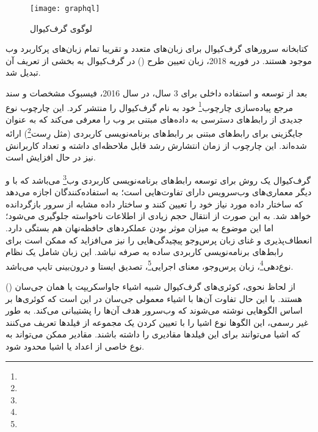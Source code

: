 \begin{figure}[H]
	\centering
	\texttt{[image: graphql]}
	\caption{لوگوی گرف‌کیوال}
	\label{fig:graphql}
\end{figure}



کتابخانه سرورهای گرف‌کیوال برای زبان‌های متعدد و تقریبا تمام زبان‌های پرکاربرد وب موجود هستند. در فوریه 2018، زبان تعیین طرح () در گرف‌کیوال به بخشی از تعریف آن تبدیل شد.

بعد از توسعه و استفاده داخلی برای 3 سال، در سال 2016، فیسبوک مشخصات و سند مرجع پیاده‌سازی چارچوب\footnote{} خود به نام گرف‌کیوال را منتشر کرد. این چارچوب نوع جدیدی از رابط‌های دسترسی به داده‌های مبتنی بر وب را معرفی می‌کند که به عنوان جایگزینی برای رابط‌های مبتنی بر رابط‌های برنامه‌نویسی کاربردی (مثل رِست\footnote{}) ارائه شده‌اند. این چارچوب از زمان انتشارش رشد قابل ملاحظه‌ای داشته و تعداد کاربرانش نیز در حال افزایش است.



گرف‌کیوال یک روش برای توسعه رابط‌های برنامه‌نویسی کاربردی وب\footnote{} می‌باشد که با  و دیگر معماری‌های وب‌سرویس دارای تفاوت‌هایی است؛ به استفاده‌کنندگان اجازه می‌دهد که ساختار داده مورد نیاز خود را تعیین کنند و ساختار داده مشابه از سرور بازگردانده خواهد شد. به این صورت از انتقال حجم زیادی از اطلاعات ناخواسته جلوگیری می‌شود؛ اما این موضوع به میزان موثر بودن عملکردهای حافظه‌نهان هم بستگی دارد. انعطاف‌پذیری و غنای زبان پرس‌وجو پیچیدگی‌هایی را نیز می‌افزاید که ممکن است برای رابط‌های برنامه‌نویسی کاربردی ساده به صرفه نباشد. این زبان شامل یک نظام نوع‌دهی\footnote{}، زبان پرس‌وجو، معنای اجرایی\footnote{}، تصدیق ایستا و درون‌بینی تایپ می‌باشد\cite{hartig2017initial}.\newline

از لحاظ نحوی، کوئری‌های گرف‌کیوال شبیه اشیاء جاواسکریپت یا همان جی‌سان () هستند. با این حال تفاوت آن‌ها با اشیاء معمولی جی‌سان در این است که کوئری‌ها بر اساس الگوهایی نوشته می‌شوند که وب‌سرور هدف آن‌ها را پشتیبانی می‌کند. به طور غیر رسمی، این الگوها نوع اشیا را با تعیین کردن یک مجموعه از فیلدها تعریف می‌کنند که اشیا می‌توانند برای این فیلدها مقادیری را داشته باشند. مقادیر ممکن می‌تواند به نوع خاصی از اعداد یا اشیا محدود شود\cite{hartig2017initial}.

